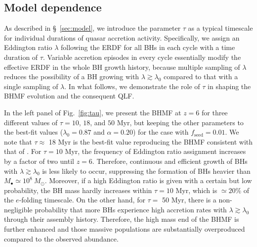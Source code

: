 \documentclass[twocolumn, twocolappendix]{aastex63}
\newcommand{\Msun}{M_\odot}
\newcommand{\tlife}{\tau}
\newcommand{\fseed}{f_\mathrm{seed}}
\begin{document}
\begin{CJK*}{UTF8}{gbsn}
\vspace{2mm}
\subsection{Model dependence}\label{sec:modep}
As described in \S~\ref{sec:model}, we introduce the parameter $\tau$ as a typical timescale
for individual durations of quasar accretion activity.
Specifically, we assign an Eddington ratio $\lambda$ following the ERDF for all BHs in each cycle
with a time duration of $\tau$.
Variable accretion episodes in every cycle essentially modify the effective ERDF in the whole BH growth history,
because multiple sampling of $\lambda$ reduces the possibility of a BH growing with $\lambda \gtrsim \lambda_0$
compared to that with a single sampling of $\lambda$.
In what follows, we demonstrate the role of $\tlife$ in shaping the BHMF evolution and the consequent QLF.

In the left panel of Fig.~\ref{fig:tau}, we present the BHMF at $z=6$ for three different values of $\tlife=10$, $18$, and $50$ Myr,
but keeping the other parameters to the best-fit values ($\lambda_0=0.87$ and $\alpha=0.20$) for the case with $\fseed=0.01$.
We note that $\tlife \approx$ 18 Myr is the best-fit value reproducing the BHMF consistent with that of .
For $\tlife=10$ Myr, the frequency of Eddington ratio assignment increases by a factor of two until $z=6$.
Therefore, continuous and efficient growth of BHs with $\lambda \gtrsim \lambda_0$ is less likely to occur,
suppressing the formation of BHs heavier than $M_\bullet \simeq 10^8~\Msun$.
Moreover, if a high Eddington ratio is given with a certain but low probability, the BH mass hardly increases
within $\tlife=10$ Myr, which is $\simeq 20\%$ of the $e$-folding timescale.
On the other hand, for $\tlife=$ 50 Myr, there is a non-negligible probability that
more BHs experience high accretion rates with $\lambda\gtrsim \lambda_0$ through their assembly history.
Therefore, the high mass end of the BHMF is further enhanced and those massive populations are substantially
overproduced compared to the observed abundance.


\end{CJK*}
\end{document}
